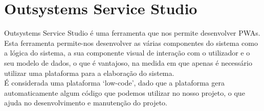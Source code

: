 \section{Outsystems Service Studio} \label{sec:outsystems}
Outsystems Service Studio é uma ferramenta que nos permite desenvolver PWAs. Esta ferramenta permite-nos desenvolver as várias componentes do sistema como a lógica do sistema, a sua componente visual de interação com o utilizador e o seu modelo de dados, o que é vantajoso, na medida em que apenas é necessário utilizar uma plataforma para a elaboração do sistema. \\
É considerada uma plataforma ‘low-code’, dado que a plataforma gera automaticamente algum código que podemos utilizar no nosso projeto, o que ajuda no desenvolvimento e manutenção do projeto.

